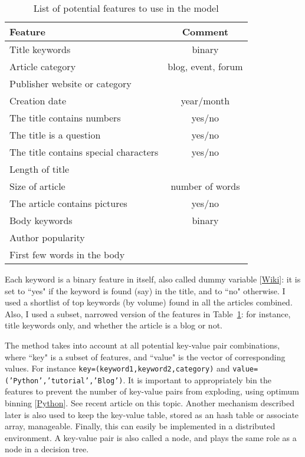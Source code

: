 \documentclass[oneside,10pt]{book}
\renewcommand{\arraystretch}{1.4} %
\begin{document}
\begin{table}%
\begin{center}
\small
\begin{tabular}{lc}
\hline
   Feature & Comment \\
\hline
Title keywords &  binary\\
Article category & blog, event, forum\\
Publisher website or category & \\
Creation date & year/month\\
The title contains numbers & yes/no\\
The title is a question & yes/no \\
The title contains special characters & yes/no \\
Length of title & \\
Size of article & number of words \\
The article contains pictures & yes/no\\
Body keywords & binary \\
Author popularity & \\
First few words in the body & \\
\hline
\end{tabular}
\caption{\label{fffdsa}List of potential features to use in the model}
\end{center}
\end{table}
\renewcommand{\arraystretch}{1.0} %


\noindent Each keyword is a binary feature in itself, also called \textcolor{index}{dummy variable} [\href{https://en.wikipedia.org/wiki/Dummy_variable_(statistics)}{Wiki}]: it is set to ``yes" if the keyword is found (say) in the title, and to ``no" otherwise. I used
 a shortlist of top keywords (by volume) found in all the articles combined. Also, I used a subset, narrowed version  
of the features in Table~\ref{fffdsa}: for instance, title keywords only, and whether the article is a blog or not.

 The method takes into account at all potential \textcolor{index}{key-value pair} combinations, where ``key" is a subset of features, and ``value" is the vector of corresponding values.
For instance \texttt{key=(keyword1,keyword2,category)} and \texttt{value=('Python','tutorial','Blog')}. It is important to appropriately bin the features 
 to prevent the number of key-value pairs from exploding, using \textcolor{index}{optimum binning} [\href{http://gnpalencia.org/optbinning/}{Python}]. 
See recent article \cite{binh2020} on this topic. Another mechanism described later  is also used to keep the key-value table, stored as an hash table or associate array, manageable. Finally, this can easily be implemented in a distributed environment.
A key-value pair is also called a \textcolor{index}{node}, and plays the same role as a node in a decision tree. 
\end{document}
